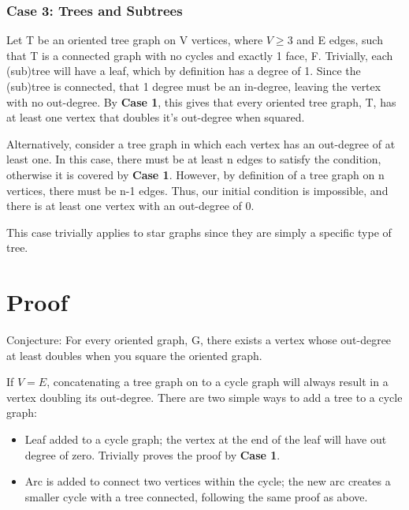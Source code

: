 \documentclass{article}
\begin{document}
\subsubsection{Case 3: Trees and Subtrees}
Let T be an oriented tree graph on V vertices, where $V\geq3$ and E edges, such that T is a connected graph with no cycles and exactly 1 face, F. Trivially, each (sub)tree will have a leaf, which by definition has a degree of 1. Since the (sub)tree is connected, that 1 degree must be an in-degree, leaving the vertex with no out-degree. By \textbf{Case 1}, this gives that every oriented tree graph, T, has at least one vertex that doubles it’s out-degree when squared.

Alternatively, consider a tree graph in which each vertex has an out-degree of at least one. In this case, there must be at least n edges to satisfy the condition, otherwise it is covered by \textbf{Case 1}. However, by definition of a tree graph on n vertices, there must be n-1 edges. Thus, our initial condition is impossible, and there is at least one vertex with an out-degree of 0.

This case trivially applies to star graphs since they are simply a specific type of tree.

\section{Proof}

\begin{flushleft}
Conjecture:  For every oriented graph, G, there exists a vertex whose out-degree at least doubles when you square the oriented graph.\break

If $V=E$, concatenating a tree graph on to a cycle graph will always result in a vertex doubling its out-degree. There are two simple ways to add a tree to a cycle graph:
\begin{itemize}
\item Leaf added to a cycle graph; the vertex at the end of the leaf will have out degree of zero. Trivially proves the proof by \textbf{Case 1}.
\item Arc is added to connect two vertices within the cycle; the new arc creates a smaller cycle with a tree connected, following the same proof as above.

\end{itemize}
\end{flushleft}
\end{document}
